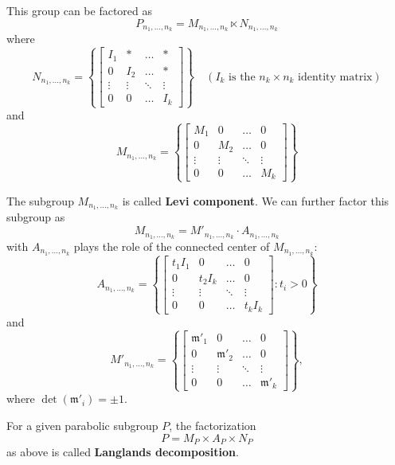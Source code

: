This group can be factored as
\[P_{n_1,\ldots, n_k} =M_{n_1,\ldots, n_k}\ltimes N_{n_1,\ldots, n_k}\]
where
\[N_{n_1,\ldots, n_k} = \left\lbrace \begin{bmatrix}
        I_1    & \ast   & \ldots & \ast   \\
        0      & I_2    & \ldots & \ast   \\
        \vdots & \vdots & \ddots & \vdots \\
        0      & 0      & \ldots & I_k
    \end{bmatrix} \right\rbrace \quad \left(I_k \text{ is the $n_k\times n_k$ identity matrix}\right)\]
and
\[M_{n_1,\ldots, n_k} = \left\lbrace \begin{bmatrix}
        M_1    & 0      & \ldots & 0      \\
        0      & M_2    & \ldots & 0      \\
        \vdots & \vdots & \ddots & \vdots \\
        0      & 0      & \ldots & M_k
    \end{bmatrix} \right\rbrace\]

The subgroup $M_{n_1,\ldots, n_k}$ is called \textbf{Levi component}. We can further factor this subgroup as
\[M_{n_1,\ldots, n_k} = M'_{n_1,\ldots, n_k} \cdot A_{n_1,\ldots, n_k}\]
with $A_{n_1,\ldots, n_k}$ plays the role of the connected center of $M_{n_1,\ldots, n_k}$:
\[A_{n_1,\ldots, n_k} = \left\lbrace \begin{bmatrix}
        t_1I_1 & 0      & \ldots & 0      \\
        0      & t_2I_k & \ldots & 0      \\
        \vdots & \vdots & \ddots & \vdots \\
        0      & 0      & \ldots & t_kI_k
    \end{bmatrix} : t_i > 0\right\rbrace \]
and
\[M'_{n_1,\ldots, n_k} = \left\lbrace \begin{bmatrix}
        \mathfrak{m}'_1 & 0               & \ldots & 0               \\
        0               & \mathfrak{m}'_2 & \ldots & 0               \\
        \vdots          & \vdots          & \ddots & \vdots          \\
        0               & 0               & \ldots & \mathfrak{m}'_k
    \end{bmatrix} \right\rbrace,\]
where $\det(\mathfrak{m}'_i) = \pm 1$.
\begin{definition}
    For a given parabolic subgroup $P$, the factorization
    \[P = M_P \times A_P \times N_P\]
    as above is called \textbf{Langlands decomposition}.
\end{definition}
